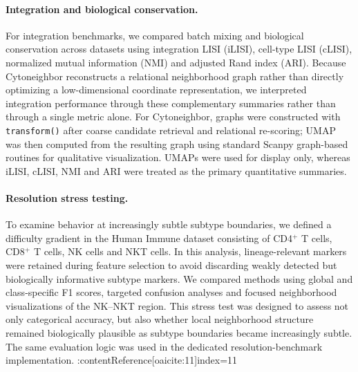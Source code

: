 \documentclass[11pt]{article}
\begin{document}
\paragraph{Integration and biological conservation.}
For integration benchmarks, we compared batch mixing and biological conservation across datasets using integration LISI (iLISI), cell-type LISI (cLISI), normalized mutual information (NMI) and adjusted Rand index (ARI)\cite{Korsunsky2019Harmony,HubertArabie1985ARI,Vinh2010NMI}. Because Cytoneighbor reconstructs a relational neighborhood graph rather than directly optimizing a low-dimensional coordinate representation, we interpreted integration performance through these complementary summaries rather than through a single metric alone. For Cytoneighbor, graphs were constructed with \texttt{transform()} after coarse candidate retrieval and relational re-scoring; UMAP was then computed from the resulting graph using standard Scanpy graph-based routines for qualitative visualization\cite{McInnes2018UMAP}. UMAPs were used for display only, whereas iLISI, cLISI, NMI and ARI were treated as the primary quantitative summaries.

\paragraph{Resolution stress testing.}
To examine behavior at increasingly subtle subtype boundaries, we defined a difficulty gradient in the Human Immune dataset consisting of CD4$^{+}$ T cells, CD8$^{+}$ T cells, NK cells and NKT cells. In this analysis, lineage-relevant markers were retained during feature selection to avoid discarding weakly detected but biologically informative subtype markers. We compared methods using global and class-specific F1 scores, targeted confusion analyses and focused neighborhood visualizations of the NK--NKT region. This stress test was designed to assess not only categorical accuracy, but also whether local neighborhood structure remained biologically plausible as subtype boundaries became increasingly subtle. The same evaluation logic was used in the dedicated resolution-benchmark implementation. :contentReference[oaicite:11]{index=11}
\end{document}
